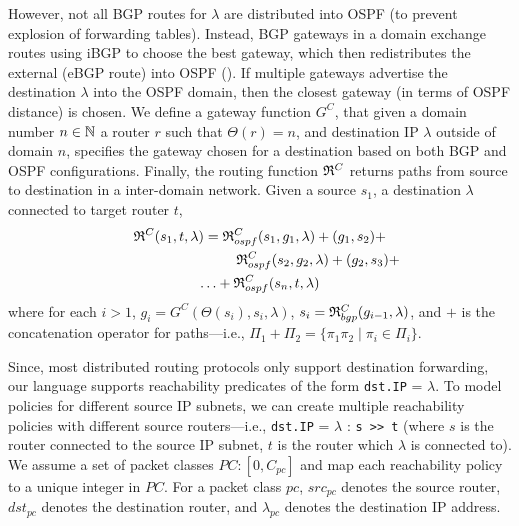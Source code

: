 However, not all BGP routes for $\lambda$
are distributed 
into OSPF (to prevent explosion of forwarding tables). Instead,
BGP gateways in a domain exchange routes using iBGP to choose
the best gateway, which then redistributes the external
(eBGP route) into OSPF (). If multiple
gateways advertise the destination $\lambda$ into the OSPF 
domain, then the closest gateway (in terms of OSPF distance)
is chosen. We define a gateway function $G^C$,
that given a domain number $n\in \mathbb{N}$
a router $r$ such that $\Theta(r)=n$,
and destination IP $\lambda$ outside of domain $n$, specifies the
gateway chosen for a destination based on both BGP and OSPF
configurations. 
Finally, the routing function 
$\mathfrak{R}^C$
returns paths from source to destination in a inter-domain network. 
Given a source $s_1$, a destination $\lambda$ connected to target router $t$, 
\begin{multline}
	\mathfrak{R}^C(s_1, t, \lambda) = 
	\mathfrak{R}_{ospf}^C(s_1,g_1, \lambda) + 
	 (g_1, s_2 )+ \\
	~~~~~~~~~~~~~~~~~~~~~~~~~\mathfrak{R}_{ospf}^C(s_2,g_2, \lambda) + (g_2, s_3) + \\
	\ldots  +\mathfrak{R}_{ospf}^C(s_n,t,\lambda)
\end{multline}
where for each $i>1$, $g_i=G^C(\Theta(s_i),s_i,\lambda)$, 
$s_i=\mathfrak{R}_{bgp}^C(g_{i-1}, \lambda)$,
and  $+$ is the concatenation operator for paths---i.e.,
$\Pi_1+\Pi_2=\{\pi_1\pi_2\mid \pi_i\in\Pi_i\}$.



Since, most distributed routing protocols only support
destination forwarding, our language supports reachability predicates 
of the form \texttt{dst.IP} = $\lambda$. To 
model policies for different source IP subnets, we can create
multiple reachability policies with different source routers---i.e.,
\texttt{dst.IP} = $\lambda$ : \texttt{s >> t} (where $s$ is
the router connected to the source IP subnet, $t$ is the router
which $\lambda$ is connected to).
We assume a set of packet classes $PC : [0,C_{pc}]$ 
and map each reachability policy to a unique integer in $PC$.
For a packet class $pc$, $src_{pc}$ denotes the source router,
$dst_{pc}$ denotes the destination router, and $\lambda_{pc}$
denotes the destination IP address. 


